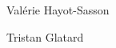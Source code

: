 \documentclass[10pt,journal,compsoc]{IEEEtran}
\begin{document}

%











\begin{IEEEbiography}{Val\'erie Hayot-Sasson}
\end{IEEEbiography}
\begin{IEEEbiography}{Tristan Glatard}
\end{IEEEbiography}
\end{document}
